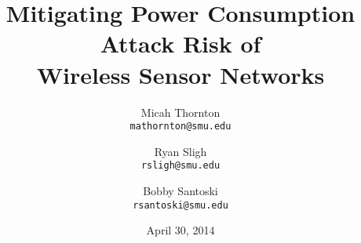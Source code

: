 \title{Mitigating Power Consumption Attack Risk of \\ Wireless Sensor Networks}
\date{April 30, 2014}
\author{Micah Thornton \\ \texttt{mathornton@smu.edu} \and Ryan Sligh \\ \texttt{rsligh@smu.edu} \and Bobby Santoski  \\\texttt{rsantoski@smu.edu}}

\maketitle